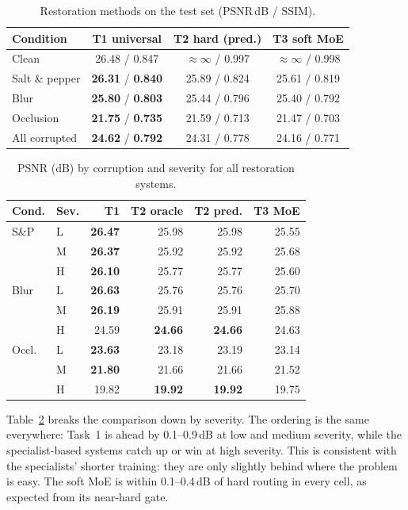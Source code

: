 ﻿\documentclass[conference]{IEEEtran}
\begin{document}
\begin{table}[t]\centering
\caption{Restoration methods on the test set (PSNR\,dB / SSIM).}\label{tab:compare}\footnotesize
\begin{tabular}{@{}lccc@{}}\toprule
Condition & T1 universal & T2 hard (pred.) & T3 soft MoE\\\midrule
Clean & 26.48 / 0.847 & $\approx\infty$ / 0.997 & $\approx\infty$ / 0.998\\
Salt \& pepper & \textbf{26.31} / \textbf{0.840} & 25.89 / 0.824 & 25.61 / 0.819\\
Blur & \textbf{25.80} / \textbf{0.803} & 25.44 / 0.796 & 25.40 / 0.792\\
Occlusion & \textbf{21.75} / \textbf{0.735} & 21.59 / 0.713 & 21.47 / 0.703\\\midrule
All corrupted & \textbf{24.62} / \textbf{0.792} & 24.31 / 0.778 & 24.16 / 0.771\\\bottomrule
\end{tabular}\end{table}

\begin{table}[t]\centering
\caption{PSNR (dB) by corruption and severity for all restoration systems.}\label{tab:sevcmp}\footnotesize
\begin{tabular}{@{}llrrrr@{}}\toprule
Cond. & Sev. & T1 & T2 oracle & T2 pred. & T3 MoE\\\midrule
S\&P & L & \textbf{26.47} & 25.98 & 25.98 & 25.55\\
 & M & \textbf{26.37} & 25.92 & 25.92 & 25.68\\
 & H & \textbf{26.10} & 25.77 & 25.77 & 25.60\\
Blur & L & \textbf{26.63} & 25.76 & 25.76 & 25.70\\
 & M & \textbf{26.19} & 25.91 & 25.91 & 25.88\\
 & H & 24.59 & \textbf{24.66} & \textbf{24.66} & 24.63\\
Occl. & L & \textbf{23.63} & 23.18 & 23.19 & 23.14\\
 & M & \textbf{21.80} & 21.66 & 21.66 & 21.52\\
 & H & 19.82 & \textbf{19.92} & \textbf{19.92} & 19.75\\\bottomrule
\end{tabular}\end{table}

Table~\ref{tab:sevcmp} breaks the comparison down by severity. The ordering is the same everywhere:
Task~1 is ahead by 0.1--0.9\,dB at low and medium severity, while the specialist-based systems catch up
or win at high severity. This is consistent with the specialists' shorter training: they are only
slightly behind where the problem is easy. The soft MoE is within 0.1--0.4\,dB of hard routing in every
cell, as expected from its near-hard gate.
\end{document}

